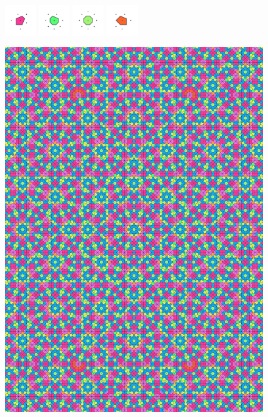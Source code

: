 \documentclass[text.tex]{subfiles}
\begin{document}
\begin{figure}[h!]
\includegraphics[width=0.12\textwidth]{img/results/circle8/circle8_149964_(4759_-1970alpha_2)_005.pdf}
\includegraphics[width=0.12\textwidth]{img/results/circle8/circle8_149964_(4759_-1970alpha_2)_006.pdf}
\includegraphics[width=0.12\textwidth]{img/results/circle8/circle8_149964_(4759_-1970alpha_2)_007.pdf}
\includegraphics[width=0.12\textwidth]{img/results/circle8/circle8_149964_(4759_-1970alpha_2)_008.pdf}
\end{figure}

\begin{figure}[h!]
\centering
\includegraphics[width=1\textwidth]{img/results/circle8/quasi_circle_149964_(4759_-1970alpha_2).pdf}
\end{figure}
\end{document}
